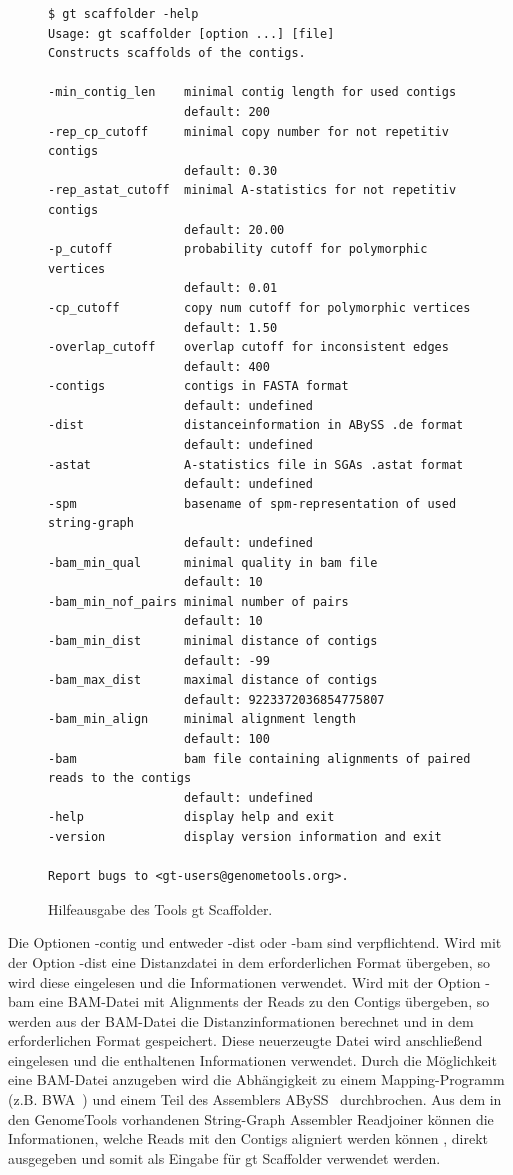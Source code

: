 \documentclass[a4paper,10pt,parskip]{scrartcl}
\begin{document}
\begin{figure}
\begin{verbatim}
$ gt scaffolder -help
Usage: gt scaffolder [option ...] [file]
Constructs scaffolds of the contigs.

-min_contig_len    minimal contig length for used contigs
                   default: 200
-rep_cp_cutoff     minimal copy number for not repetitiv contigs
                   default: 0.30
-rep_astat_cutoff  minimal A-statistics for not repetitiv contigs
                   default: 20.00
-p_cutoff          probability cutoff for polymorphic vertices
                   default: 0.01
-cp_cutoff         copy num cutoff for polymorphic vertices
                   default: 1.50
-overlap_cutoff    overlap cutoff for inconsistent edges
                   default: 400
-contigs           contigs in FASTA format
                   default: undefined
-dist              distanceinformation in ABySS .de format
                   default: undefined
-astat             A-statistics file in SGAs .astat format
                   default: undefined
-spm               basename of spm-representation of used string-graph
                   default: undefined
-bam_min_qual      minimal quality in bam file
                   default: 10
-bam_min_nof_pairs minimal number of pairs
                   default: 10
-bam_min_dist      minimal distance of contigs
                   default: -99
-bam_max_dist      maximal distance of contigs
                   default: 9223372036854775807
-bam_min_align     minimal alignment length
                   default: 100
-bam               bam file containing alignments of paired reads to the contigs
                   default: undefined
-help              display help and exit
-version           display version information and exit

Report bugs to <gt-users@genometools.org>.
\end{verbatim}
\caption{\label{abb: help}Hilfeausgabe des Tools gt Scaffolder.}
\end{figure}

Die Optionen -contig und entweder -dist oder -bam sind
verpflichtend. Wird mit der Option -dist eine Distanzdatei in dem
erforderlichen Format übergeben, so wird diese eingelesen und die
Informationen verwendet. Wird mit der Option -bam eine BAM-Datei mit
Alignments der Reads zu den Contigs übergeben, so werden aus der
BAM-Datei die Distanzinformationen berechnet und in dem erforderlichen
Format gespeichert. Diese neuerzeugte Datei wird anschließend
eingelesen und die enthaltenen Informationen verwendet. Durch die
Möglichkeit eine BAM-Datei anzugeben wird die Abhängigkeit zu einem
Mapping-Programm (z.B. BWA~\cite{BWA}) und einem Teil des
Assemblers ABySS~\cite{abyss} durchbrochen. Aus dem in den
GenomeTools vorhandenen String-Graph Assembler Readjoiner können die
Informationen, welche Reads mit den Contigs aligniert werden können ,
direkt ausgegeben und somit als Eingabe für gt Scaffolder verwendet
werden.
\end{document}
